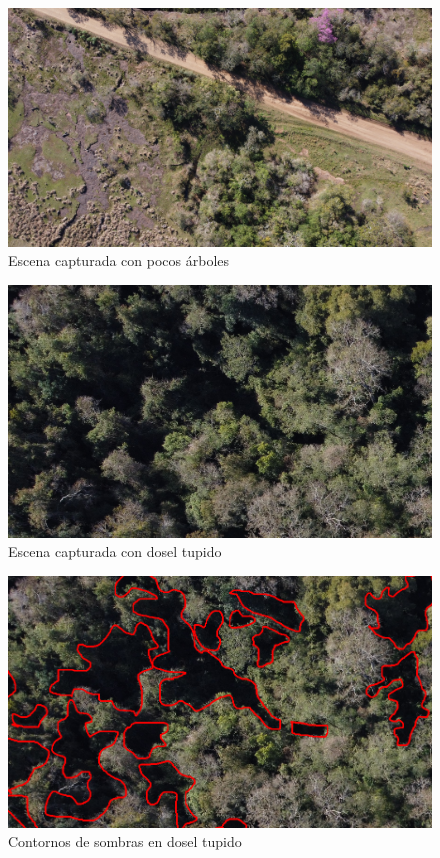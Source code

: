 \begin{figure}[h!]
    \includegraphics[width=\textwidth]{Imagenes/street.jpg}
     \hfill
     \caption{Escena capturada con pocos árboles}
    \label{calle}
\end{figure}

\begin{figure}[h!]
    \includegraphics[width=\textwidth]{Imagenes/dense canopy.jpg}
     \hfill
     \caption{Escena capturada con dosel tupido}
    \label{tupido}
\end{figure}


\begin{figure}[h!]
    \includegraphics[width=\textwidth]{Imagenes/contours.png}
     \hfill
     \caption{Contornos de sombras en dosel tupido}
    \label{contorno1}
\end{figure}

